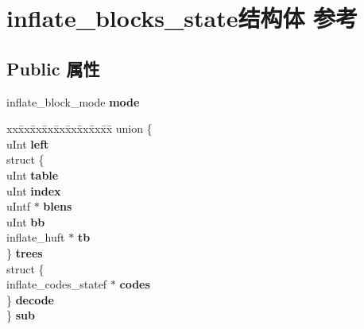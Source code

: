 \hypertarget{structinflate__blocks__state}{}\section{inflate\+\_\+blocks\+\_\+state结构体 参考}
\label{structinflate__blocks__state}
\subsection*{Public 属性}
\begin{DoxyCompactItemize}
\item 
\mbox{\label{structinflate__blocks__state_a1854f32dadd0e66a483ac67800fe7728}} 
inflate\+\_\+block\+\_\+mode {\bfseries mode}
\item 
\mbox{\label{structinflate__blocks__state_a0fa6d3374a9d9fe99ff75a32b5c4cd07}} 
\begin{tabbing}
xx\=xx\=xx\=xx\=xx\=xx\=xx\=xx\=xx\=\kill
union \{\\
\>uInt {\bfseries left}\\
\>struct \{\\
\>\>uInt {\bfseries table}\\
\>\>uInt {\bfseries index}\\
\>\>uIntf $\ast$ {\bfseries blens}\\
\>\>uInt {\bfseries bb}\\
\>\>inflate\_huft $\ast$ {\bfseries tb}\\
\>\} {\bfseries trees}\\
\>struct \{\\
\>\>inflate\_codes\_statef $\ast$ {\bfseries codes}\\
\>\} {\bfseries decode}\\
\} {\bfseries sub}\\


\end{tabbing}
\end{DoxyCompactItemize}
